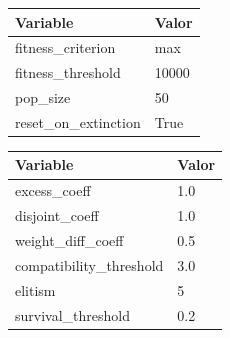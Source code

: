 \documentclass[lettersize, journal]{IEEEtran}
\begin{document}
\renewcommand{\thetable}{S\arabic{table}T}
\begin{table}[H]
    \centering
    \label{tab:NEAT}
    \begin{tabular}{ll}
    \toprule
    \textbf{Variable} & \textbf{Valor} \\
    \midrule
    fitness\_criterion     & max \\
    fitness\_threshold     & 10000 \\
    pop\_size              & 50 \\
    reset\_on\_extinction  & True  \\
    \bottomrule
    \end{tabular}
    \vspace{0.5cm}
    
    \centering
    \label{tab:DefaultReproduction}
    \begin{tabular}{ll}
    \toprule
    \textbf{Variable} & \textbf{Valor} \\
    \midrule
    excess\_coeff            & 1.0 \\
    disjoint\_coeff          & 1.0 \\
    weight\_diff\_coeff      & 0.5 \\
    compatibility\_threshold & 3.0 \\
    elitism                  & 5 \\
    survival\_threshold      & 0.2 \\
    \bottomrule
    \end{tabular}
    \vspace{0.5cm}
\end{table}
\end{document}
